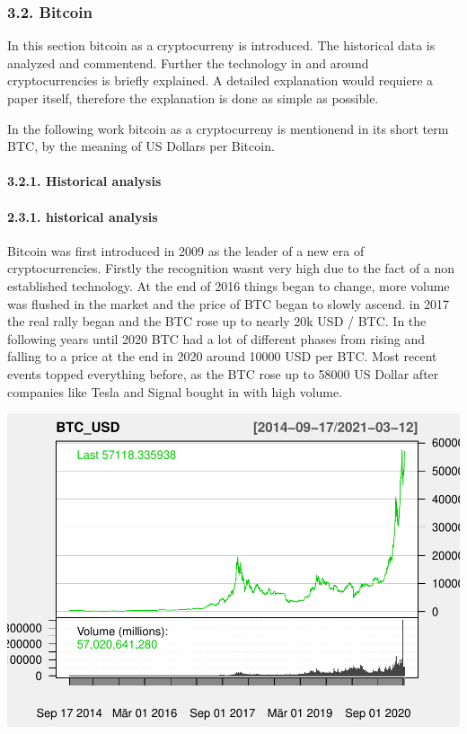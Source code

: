 \documentclass[
]{article}
\begin{document}
\hypertarget{bitcoin}{%
\subsubsection{3.2. Bitcoin}\label{bitcoin}}

In this section bitcoin as a cryptocurreny is introduced. The historical
data is analyzed and commentend. Further the technology in and around
cryptocurrencies is briefly explained. A detailed explanation would
requiere a paper itself, therefore the explanation is done as simple as
possible.

In the following work bitcoin as a cryptocurreny is mentionend in its
short term BTC, by the meaning of US Dollars per Bitcoin.

\hypertarget{historical-analysis}{%
\paragraph{3.2.1. Historical analysis}\label{historical-analysis}}

\hypertarget{historical-analysis-1}{%
\paragraph{2.3.1. historical analysis}\label{historical-analysis-1}}

Bitcoin was first introduced in 2009 as the leader of a new era of
cryptocurrencies. Firstly the recognition wasnt very high due to the
fact of a non established technology. At the end of 2016 things began to
change, more volume was flushed in the market and the price of BTC began
to slowly ascend. in 2017 the real rally began and the BTC rose up to
nearly 20k USD / BTC. In the following years until 2020 BTC had a lot of
different phases from rising and falling to a price at the end in 2020
around 10000 USD per BTC. Most recent events topped everything before,
as the BTC rose up to 58000 US Dollar after companies like Tesla and
Signal bought in with high volume.

\begin{center}\includegraphics[width=0.7\linewidth]{00_main_files/figure-latex/unnamed-chunk-10-1} \end{center}
\end{document}
